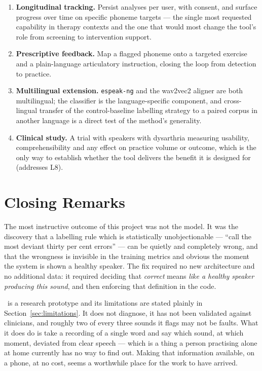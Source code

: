 \begin{enumerate}[leftmargin=*, resume]
  \item \textbf{Longitudinal tracking.} Persist analyses per user, with consent,
        and surface progress over time on specific phoneme targets --- the single
        most requested capability in therapy contexts and the one that would
        most change the tool's role from screening to intervention support.
  \item \textbf{Prescriptive feedback.} Map a flagged phoneme onto a targeted
        exercise and a plain-language articulatory instruction, closing the loop
        from detection to practice.
  \item \textbf{Multilingual extension.} \texttt{espeak-ng} and the wav2vec2
        aligner are both multilingual; the classifier is the language-specific
        component, and cross-lingual transfer of the control-baseline labelling
        strategy to a paired corpus in another language is a direct test of the
        method's generality.
  \item \textbf{Clinical study.} A trial with speakers with dysarthria measuring
        usability, comprehensibility and any effect on practice volume or
        outcome, which is the only way to establish whether the tool delivers
        the benefit it is designed for (addresses L8).
\end{enumerate}

\section{Closing Remarks}
\label{sec:conc-closing}

The most instructive outcome of this project was not the model. It was the
discovery that a labelling rule which is statistically unobjectionable ---
``call the most deviant thirty per cent errors'' --- can be quietly and
completely wrong, and that the wrongness is invisible in the training metrics
and obvious the moment the system is shown a healthy speaker. The fix required
no new architecture and no additional data: it required deciding that
\emph{correct} means \emph{like a healthy speaker producing this sound}, and
then enforcing that definition in the code.

\systemName\ is a research prototype and its limitations are stated plainly in
Section~\ref{sec:limitations}. It does not diagnose, it has not been validated
against clinicians, and roughly two of every three sounds it flags may not be
faults. What it does do is take a recording of a single word and say which
sound, at which moment, deviated from clear speech --- which is a thing a person
practising alone at home currently has no way to find out. Making that
information available, on a phone, at no cost, seems a worthwhile place for the
work to have arrived.
